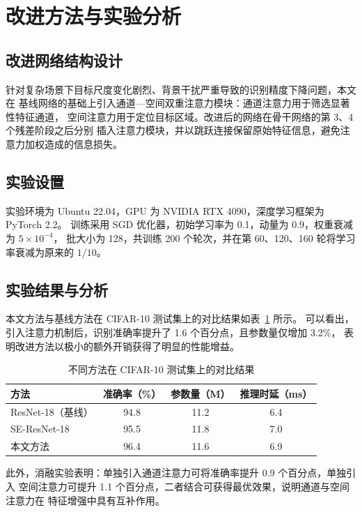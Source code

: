 \section{改进方法与实验分析}

\subsection{改进网络结构设计}

\quad 针对复杂场景下目标尺度变化剧烈、背景干扰严重导致的识别精度下降问题，本文在
基线网络的基础上引入通道—空间双重注意力模块：通道注意力用于筛选显著性特征通道，
空间注意力用于定位目标区域。改进后的网络在骨干网络的第 3、4 个残差阶段之后分别
插入注意力模块，并以跳跃连接保留原始特征信息，避免注意力加权造成的信息损失。

\subsection{实验设置}

\quad 实验环境为 Ubuntu 22.04，GPU 为 NVIDIA RTX 4090，深度学习框架为 PyTorch 2.2。
训练采用 SGD 优化器，初始学习率为 0.1，动量为 0.9，权重衰减为 $5 \times 10^{-4}$，
批大小为 128，共训练 200 个轮次，并在第 60、120、160 轮将学习率衰减为原来的
$1/10$。

\subsection{实验结果与分析}

\quad 本文方法与基线方法在 CIFAR-10 测试集上的对比结果如表~\ref{tab-results} 所示。
可以看出，引入注意力机制后，识别准确率提升了 1.6 个百分点，且参数量仅增加 3.2\%，
表明改进方法以极小的额外开销获得了明显的性能增益。

\begin{table}[htbp]
  \centering
  \caption{不同方法在 CIFAR-10 测试集上的对比结果}
  \label{tab-results}
  \begin{tabular}{lccc}
    \toprule
    方法 & 准确率（\%） & 参数量（M） & 推理时延（ms） \\
    \midrule
    ResNet-18（基线）        & 94.8 & 11.2 & 6.4 \\
    SE-ResNet-18             & 95.5 & 11.8 & 7.0 \\
    本文方法                 & 96.4 & 11.6 & 6.9 \\
    \bottomrule
  \end{tabular}
\end{table}

\quad 此外，消融实验表明：单独引入通道注意力可将准确率提升 0.9 个百分点，单独引入
空间注意力可提升 1.1 个百分点，二者结合可获得最优效果，说明通道与空间注意力在
特征增强中具有互补作用。
